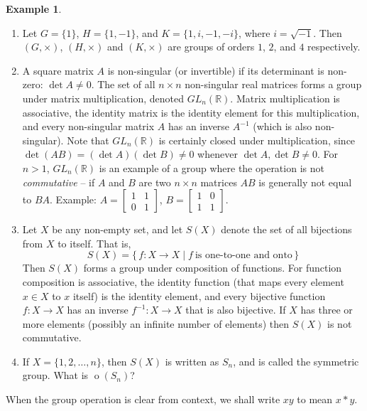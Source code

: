 \documentclass[svgnames]{article}
\theoremstyle{definition}
\newtheorem{Example}[Example]{Example}
\theoremstyle{remark}
\DeclareMathOperator{\ord}{o}
\newcommand{\newterm}[1]{{\color{alertcolor} #1}}
\begin{document}
\begin{Example}
\begin{enumerate}
\item\label{it:GrpEx<i>} Let $G = \{1\}$, $H = \{1, -1\}$, and $K = \{1, i, -1, -i\}$, where $i = \sqrt{-1}$. Then $(G, \times)$, $(H, \times)$ and $(K, \times)$ are groups of orders $1$, $2$, and $4$ respectively.
\item\label{it:GrpExGL} A square matrix $A$ is \newterm{non-singular} (or \newterm{invertible}) if its determinant is non-zero: $\det A \ne 0$. The set of all $n \times n$ non-singular real matrices forms a group under matrix multiplication, denoted $GL_n(\mathbb R)$. Matrix multiplication is associative, the identity matrix is the identity element for this multiplication, and every non-singular matrix $A$ has an inverse $A^{-1}$ (which is also non-singular). Note that $GL_n(\mathbb R)$ is certainly closed under multiplication, since $\det(AB) = (\det A)(\det B) \ne 0$ whenever $\det A, \det B \ne 0$. For $n > 1$, $GL_n(\mathbb R)$ is an example of a group where the operation is not \emph{commutative} -- if $A$ and $B$ are two $n \times n$ matrices $AB$ is generally not equal to $BA$. Example: $A = \begin{bmatrix} 1 & 1\\ 0 & 1\end{bmatrix}$, $B = \begin{bmatrix}1 & 0\\ 1 & 1\end{bmatrix}$.
\item\label{it:GrpExS(X)} Let $X$ be any non-empty set, and let $S(X)$ denote the set of all bijections from $X$ to itself. That is,
\begin{equation*}
S(X) = \{\, f\colon X \to X \mid f\ \text{is one-to-one and onto} \,\}
\end{equation*}
Then $S(X)$ forms a group under composition of functions. For function composition is associative, the identity function (that maps every element $x \in X$ to $x$ itself) is the identity element, and every bijective function $f \colon X \to X$ has an inverse $f^{-1} \colon X \to X$ that is also bijective. If $X$ has three or more elements (possibly an infinite number of elements) then $S(X)$ is not commutative.
\item\label{it:GrpExSn} If $X = \{1, 2, \ldots, n\}$, then $S(X)$ is written as $S_n$, and is called the \newterm{symmetric group}. What is $\ord(S_n)$?
\end{enumerate}
\end{Example}

When the group operation is clear from context, we shall write $xy$ to mean $x * y$.
\end{document}
